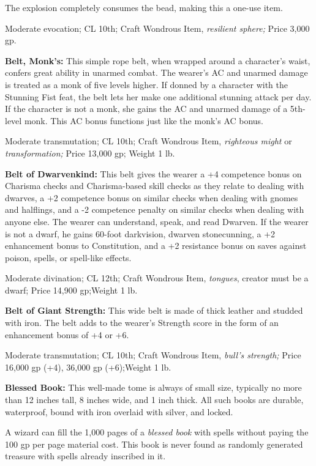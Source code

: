 \documentclass{article}
\begin{document}
The explosion completely consumes the bead, making this a one-use item.

Moderate evocation; CL 10th; Craft Wondrous Item, \textit{resilient sphere; }Price 
3,000 gp.

\textbf{Belt, Monk's:} This simple rope belt, when wrapped around a character's 
waist, confers great ability in unarmed combat. The wearer's AC and unarmed damage 
is treated as a monk of five levels higher. If donned by a character with the Stunning 
Fist feat, the belt lets her make one additional stunning attack per day. If the 
character is not a monk, she gains the AC and unarmed damage of a 5th-level monk. 
This AC bonus functions just like the monk's AC bonus.

Moderate transmutation; CL 10th; Craft Wondrous Item, \textit{righteous might }or 
\textit{transformation; }Price 13,000 gp; Weight 1 lb.

\textbf{Belt of Dwarvenkind: }This belt gives the wearer a +4 competence bonus 
on Charisma checks and Charisma-based skill checks as they relate to dealing with 
dwarves, a +2 competence bonus on similar checks when dealing with gnomes and halflings, 
and a -2 competence penalty on similar checks when dealing with anyone else. The 
wearer can understand, speak, and read Dwarven. If the wearer is not a dwarf, he 
gains 60-foot darkvision, dwarven stonecunning, a +2 enhancement bonus to Constitution, 
and a +2 resistance bonus on saves against poison, spells, or spell-like effects.

Moderate divination; CL 12th; Craft Wondrous Item, \textit{tongues}, creator must 
be a dwarf; Price 14,900 gp;Weight 1 lb.

\textbf{Belt of Giant Strength:} This wide belt is made of thick leather and studded 
with iron. The belt adds to the wearer's Strength score in the form of an enhancement 
bonus of +4 or +6.

Moderate transmutation; CL 10th; Craft Wondrous Item, \textit{bull's strength; 
}Price 16,000 gp (+4), 36,000 gp (+6);Weight 1 lb.

\textbf{Blessed Book:} This well-made tome is always of small size, typically no 
more than 12 inches tall, 8 inches wide, and 1 inch thick. All such books are durable, 
waterproof, bound with iron overlaid with silver, and locked.

A wizard can fill the 1,000 pages of a \textit{blessed book }with spells without 
paying the 100 gp per page material cost. This book is never found as randomly 
generated treasure with spells already inscribed in it.
\end{document}
